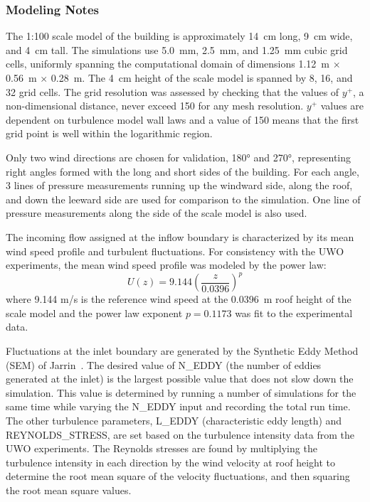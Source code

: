 \subsubsection{Modeling Notes}

The 1:100 scale model of the building is approximately 14~cm long, 9~cm wide, and 4~cm tall. The simulations use 5.0~mm, 2.5~mm, and 1.25~mm cubic grid cells, uniformly spanning the computational domain of dimensions 1.12~m $\times$ 0.56~m $\times$ 0.28~m. The 4~cm height of the scale model is spanned by 8, 16, and 32 grid cells. The grid resolution was assessed by checking that the values of $y^+$, a non-dimensional distance, never exceed 150 for any mesh resolution. $y^+$ values are dependent on turbulence model wall laws and a value of 150 means that the first grid point is well within the logarithmic region.

Only two wind directions are chosen for validation, 180\si{\degree} and 270\si{\degree}, representing right angles formed with the long and short sides of the building. For each angle, 3 lines of pressure measurements running up the windward side, along the roof, and down the leeward side are used for comparison to the simulation. One line of pressure measurements along the side of the scale model is also used.

The incoming flow assigned at the inflow boundary is characterized by its mean wind speed profile and turbulent fluctuations. For consistency with the UWO experiments, the mean wind speed profile was modeled by the power law:
\begin{equation}
U(z) = 9.144 \left(\frac{z}{0.0396}\right)^p
\end{equation}
where 9.144 m/s is the reference wind speed at the 0.0396~m roof height of the scale model and the power law exponent $p=0.1173$ was fit to the experimental data.

Fluctuations at the inlet boundary are generated by the Synthetic Eddy Method (SEM) of Jarrin~\cite{Jarrin:2008}. The desired value of {\ct N\_EDDY} (the number of eddies generated at the inlet) is the largest possible value that does not slow down the simulation. This value is determined by running a number of simulations for the same time while varying the {\ct N\_EDDY} input and recording the total run time. The other turbulence parameters, {\ct L\_EDDY} (characteristic eddy length) and {\ct REYNOLDS\_STRESS}, are set based on the turbulence intensity data from the UWO experiments. The Reynolds stresses are found by multiplying the turbulence intensity in each direction by the wind velocity at roof height to determine the root mean square of the velocity fluctuations, and then squaring the root mean square values.

